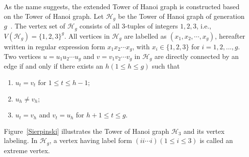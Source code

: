 \documentclass[10pt,twocolumn,twoside]{IEEEtran}
\begin{document}
As the name suggests, the extended Tower of Hanoi graph is constructed  based on the Tower of Hanoi graph.  Let \(\mathcal{H}_{g}\)  be the  Tower of Hanoi graph of generation \(g\)~\cite{HiKlMiPeSt13}. The vertex set of \(\mathcal{H}_{g}\) consists of all \(3\)-tuples of integers \(1,2,3\), i.e., \(V(\mathcal{H}_{g})=\{1,2,3\}^g\). All vertices in \(\mathcal{H}_{g}\) are labelled as \((x_1,x_2,\cdots,x_g)\), hereafter written in regular expression form \(x_1x_2\cdots x_g\), with \(x_i\in\{1,2,3\}\) for \(i=1,2,...,g\). Two vertices \(u=u_1u_2\cdots u_g\) and \(v=v_1v_2\cdots v_g\) in \(\mathcal{H}_{g}\) are directly connected by an edge if and only if there exists an \(h(1\le h\le g)\) such that
\begin{enumerate}
    \item \(u_t=v_t\) for \(1\le t\le h-1\);
    \item \(u_h\neq v_h\);
    \item \(u_t=v_h\) and \(v_t=u_h\) for \(h+1\le t\le g\).
\end{enumerate}

Figure~\ref{Sierpinski} illustrates the  Tower of Hanoi graph \(\mathcal{H}_{3}\) and its vertex labeling. In \(\mathcal{H}_{g}\), a vertex having label form \((ii\cdots i)(1\le i\le 3)\) is called an extreme vertex.

\end{document}
